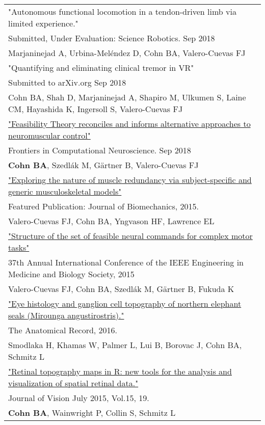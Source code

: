 \documentclass[10pt,a4paper]{article}
\begin{document}
  \vspace*{1mm}\begin{tabularx}{17cm}{X}

   "Autonomous functional locomotion in a tendon-driven limb via limited experience."\\
   Submitted, Under Evaluation: Science Robotics. Sep 2018 \\
   Marjaninejad A, Urbina-Meléndez D, Cohn BA, Valero-Cuevas FJ\\[2mm]

    "Quantifying and eliminating clinical tremor in VR"\\
    Submitted to arXiv.org Sep 2018 \\
    Cohn BA, Shah D, Marjaninejad A, Shapiro M, Ulkumen S, Laine CM, Hayashida K, Ingersoll S, Valero­-Cuevas FJ \\[2mm]


   \href{https://github.com/bc/resume/raw/master/papers/cohn_et_al_2018_frontiers.pdf}{"Feasibility Theory reconciles and informs alternative approaches to neuromuscular control"}\\
   Frontiers in Computational Neuroscience. Sep 2018 \\
	 \textbf{Cohn BA}, Szedl\'{a}k M, G{\"a}rtner B, Valero-Cuevas FJ \\[2mm]

    \href{https://github.com/bc/resume/raw/master/papers/valero_cuevas_2015_job.pdf}{"Exploring the nature of muscle redundancy via subject-specific and generic musculoskeletal models" }\\
    Featured Publication: Journal of Biomechanics, 2015. \\
    Valero-Cuevas FJ, Cohn BA, Yngvason HF, Lawrence EL \\[2mm]

    \href{https://github.com/bc/resume/raw/master/papers/valero_cuevas_et_al_2015_ieee_embs.pdf}{"Structure of the set of feasible neural commands for complex motor tasks" }\\
    37th Annual International Conference of the IEEE Engineering in Medicine and Biology Society, 2015 \\
    Valero-Cuevas FJ, Cohn BA, Szedl\'{a}k M, G{\"a}rtner B, Fukuda K \\[2mm]

    \href{smodlaka_et_al_2016_the_anatomical_record.pdf}{"Eye histology and ganglion cell topography of northern elephant seals (Mirounga angustirostris)."} \\
    The Anatomical Record, 2016. \\
    Smodlaka H, Khamas W, Palmer L, Lui B, Borovac J, Cohn BA, Schmitz L \\[2mm]

    \href{https://github.com/bc/resume/raw/master/papers/cohn_et_al_2015_jov.pdf}{"Retinal topography maps in R: new tools for the analysis and visualization of spatial retinal data."} \\
    Journal of Vision July 2015, Vol.15, 19. \\
    \textbf{Cohn BA}, Wainwright P, Collin S, Schmitz L \\[2mm]

    
  \end{tabularx}
\end{document}
